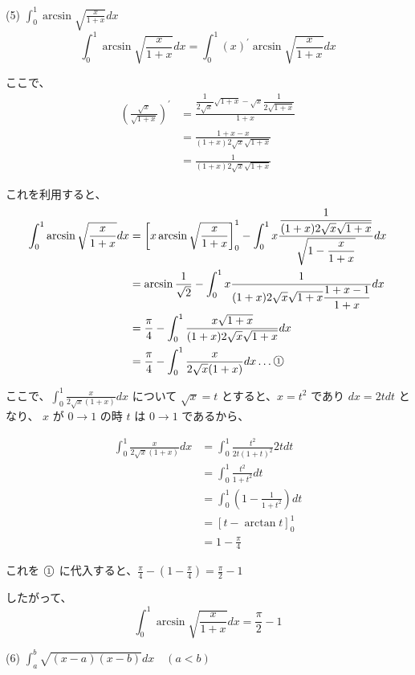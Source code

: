 \documentclass[a4j]{jsarticle}
\newcommand{\ctext}[1]{\raise0.2ex\hbox{\textcircled{\scriptsize{#1}}}} %
\begin{document}
    (5) $\displaystyle \int_{0}^{1} \arcsin \sqrt{\frac{x}{1 + x}} dx$ \\

    \begin{equation*}
        \int_{0}^{1} \arcsin \sqrt{\frac{x}{1 + x}} dx = \int_{0}^{1} (x)^{\prime} \arcsin \sqrt{\frac{x}{1 + x}} dx
    \end{equation*}

    ここで、
    \begin{align*}
        \left(\frac{\sqrt{x}}{\sqrt{1 + x}}\right)^{\prime} &= \frac{\dfrac{1}{2\sqrt{x}}\sqrt{1 + x} - \sqrt{x}\dfrac{1}{2\sqrt{1 + x}}}{1 + x} \\
        &= \frac{1 + x - x}{(1 + x)2 \sqrt{x}\sqrt{1 + x}} \\
        &= \frac{1}{(1 + x)2\sqrt{x}\sqrt{1 + x}}
    \end{align*}

    これを利用すると、
    \begin{align*}
        \int_{0}^{1} \arcsin \sqrt{\frac{x}{1 + x}} dx &= \left[x \arcsin \sqrt{\dfrac{x}{1 + x}}\right]_{0}^{1} - \int_{0}^{1} x \frac{\dfrac{1}{(1 + x)2\sqrt{x}\sqrt{1 + x}}}{\sqrt{1 - \dfrac{x}{1 + x}}} dx \\
        &= \arcsin \frac{1}{\sqrt{2}} - \int_0^1 x \frac{1}{(1 + x)2 \sqrt{x} \sqrt{1 + x} \dfrac{1 + x - 1}{1 + x}} dx \\
        &= \frac{\pi}{4} - \int_{0}^{1} \frac{x \sqrt{1 + x}}{(1 + x)2 \sqrt{x} \sqrt{1 + x}} dx \\
        &= \frac{\pi}{4} - \int_{0}^{1} \frac{x}{2 \sqrt{x} (1 + x)} dx \dots \ctext{1}
    \end{align*}

    ここで、$\displaystyle \int_{0}^{1} \frac{x}{2 \sqrt{x} (1 + x)} dx$ について $\displaystyle \sqrt{x} = t$ とすると、$x = t^2$ であり $dx = 2tdt$ となり、
    $x$ が $0 \rightarrow 1$ の時 $t$ は $0 \rightarrow 1$ であるから、

    \begin{align*}
        \int_{0}^{1} \frac{x}{2 \sqrt{x} (1 + x)} dx &= \int_{0}^{1} \frac{t^2}{2t(1 + t)^2}2tdt \\
        &= \int_{0}^{1} \frac{t^2}{1 + t^2} dt \\
        &= \int_{0}^{1} \left(1 - \frac{1}{1 + t^2}\right) dt \\
        &= \left[t - \arctan t\right]_{0}^{1} \\
        &= 1 - \frac{\pi}{4}
    \end{align*}

    これを $\ctext{1}$ に代入すると、$\displaystyle \frac{\pi}{4} - \left(1 - \frac{\pi}{4}\right) = \frac{\pi}{2} - 1$

    したがって、
    \begin{equation*}
        \int_{0}^{1} \arcsin \sqrt{\frac{x}{1 + x}} dx = \frac{\pi}{2} - 1
    \end{equation*}

    (6) $\displaystyle \int_{a}^{b} \sqrt{(x - a)(x - b)} dx \quad (a < b)$ \\
\end{document}
